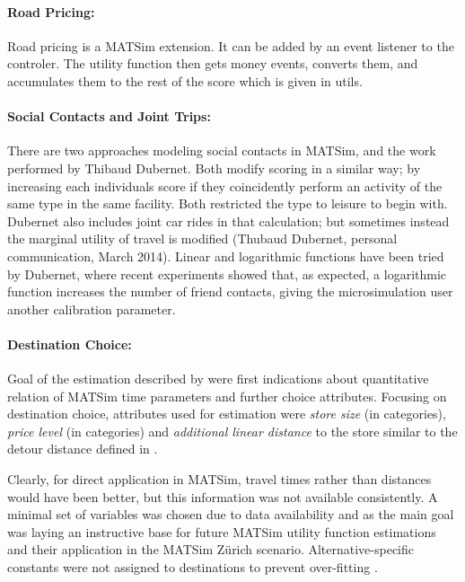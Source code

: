 \paragraph{Road Pricing:}
Road pricing is a MATSim extension. It can be added by an event listener to the controler. The utility function then gets money events, converts them, and accumulates them to the rest of the score which is given in utils.

\paragraph{Social Contacts and Joint Trips:}
There are two approaches modeling social contacts in MATSim, \citet[][]{Hackney_PhDThesis_2009} and the work performed by Thibaud Dubernet. Both modify scoring in a similar way; by increasing each individuals score if they coincidently perform an activity of the same type in the same facility. Both restricted the type to leisure to begin with. Dubernet also includes joint car rides in that calculation; but sometimes instead the marginal utility of travel is modified (Thubaud Dubernet, personal communication, March 2014). Linear and logarithmic functions have been tried by Dubernet, where recent experiments showed that, as expected, a logarithmic function increases the number of friend contacts, giving the microsimulation user another calibration parameter. 

\paragraph{Destination Choice:}
Goal of the estimation described by \citet[][]{Horni_PhDThesis_2013} were first indications about quantitative relation of MATSim time parameters and further choice attributes. Focusing on destination choice, attributes used for estimation were \emph{store size} (in categories), \emph{price level} (in categories) and \emph{additional linear distance} to the store similar to the detour distance defined in \citet[][]{ArentzeTimmermans_TRR_2007}.

Clearly, for direct application in MATSim, travel times rather than distances would have been better, but this information was not available consistently. A minimal set of variables was chosen due to data availability and as the main goal was laying an instructive base for future MATSim utility function estimations and their application in the MATSim Zürich scenario. Alternative-specific constants were not assigned to destinations to prevent over-fitting \citep[][]{BierlaireEtAl_TransScience_1997}.

